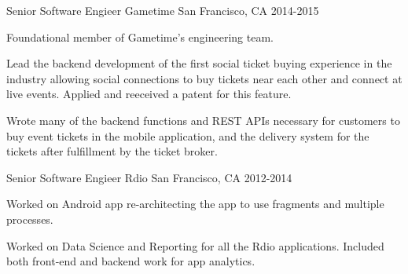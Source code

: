 \begin{cventries}
  \cventry
    {Senior Software Engieer} %
    {Gametime} %
    {San Francisco, CA} %
    {2014-2015} %
    {
      \begin{cvitems} %
        \item {Foundational member of Gametime's engineering team.}
        \item {Lead the backend development of the first social ticket buying experience in the industry allowing social connections to buy tickets near each other and connect at live events. Applied and reeceived a patent for this feature.}
        \item {Wrote many of the backend functions and REST APIs necessary for customers to buy event tickets in the mobile application, and the delivery system for the tickets after fulfillment by the ticket broker.}
      \end{cvitems}
    }

  \cventry
    {Senior Software Engieer} %
    {Rdio} %
    {San Francisco, CA} %
    {2012-2014} %
    {
      \begin{cvitems} %
        \item {Worked on Android app re-architecting the app to use fragments and multiple processes.}
        \item {Worked on Data Science and Reporting for all the Rdio applications. Included both front-end and backend work for app analytics.}
      \end{cvitems}
    }

\end{cventries}
